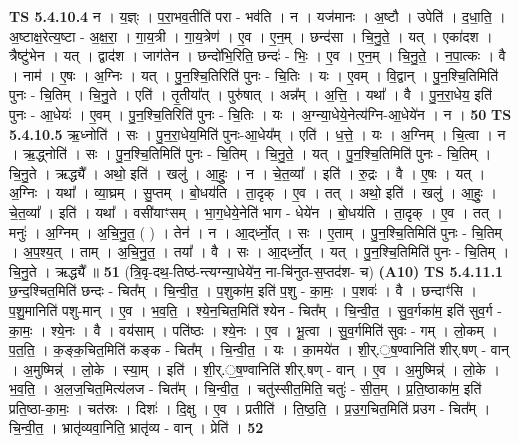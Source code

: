 \documentclass[17pt]{extarticle}
\begin{document}
                  \newline
                                \textbf{ TS 5.4.10.4} \newline
                  न । य॒ज्ञ्ः । प॒रा॒भव॒तीति॑ परा - भव॑ति । न । यज॑मानः । अ॒ष्टौ । उपेति॑ । द॒धा॒ति॒ । अ॒ष्टाक्ष॒रेत्य॒ष्टा - अ॒क्ष॒रा॒ । गा॒य॒त्री । गा॒य॒त्रेण॑ । ए॒व । ए॒न॒म् । छन्द॑सा । चि॒नु॒ते॒ । यत् । एका॑दश । त्रैष्टु॑भेन । यत् । द्वाद॑श । जाग॑तेन । छन्दो॑भि॒रिति॒ छन्दः॑ - भिः॒ । ए॒व । ए॒न॒म् । चि॒नु॒ते॒ । न॒पा॒त्कः । वै । नाम॑ । ए॒षः । अ॒ग्निः । यत् । पु॒न॒श्चि॒तिरिति॑ पुनः - चि॒तिः । यः । ए॒वम् । वि॒द्वान् । पु॒न॒श्चि॒तिमिति॑ पुनः - चि॒तिम् । चि॒नु॒ते । एति॑ । तृ॒तीया᳚त् । पुरु॑षात् । अन्न᳚म् । अ॒त्ति॒ । यथा᳚ । वै । पु॒न॒रा॒धेय॒ इति॑ पुनः - आ॒धेयः॑ । ए॒वम् । पु॒न॒श्चि॒तिरिति॑ पुनः - चि॒तिः । यः । अ॒ग्न्या॒धेये॒नेत्य॑ग्नि-आ॒धेये॑न । न । \textbf{  50} \newline
                  \newline
                                \textbf{ TS 5.4.10.5} \newline
                  ऋ॒ध्नोति॑ । सः । पु॒न॒रा॒धेय॒मिति॑ पुनः-आ॒धेय᳚म् । एति॑ । ध॒त्ते॒ । यः । अ॒ग्निम् । चि॒त्वा । न । ऋ॒द्ध्नोति॑ । सः । पु॒न॒श्चि॒तिमिति॑ पुनः - चि॒तिम् । चि॒नु॒ते॒ । यत् । पु॒न॒श्चि॒तिमिति॑ पुनः - चि॒तिम् । चि॒नु॒ते । ऋद्ध्यै᳚ । अथो॒ इति॑ । खलु॑ । आ॒हुः॒ । न । चे॒त॒व्या᳚ । इति॑ । रु॒द्रः । वै । ए॒षः । यत् । अ॒ग्निः । यथा᳚ । व्या॒घ्रम् । सु॒प्तम् । बो॒धय॑ति । ता॒दृक् । ए॒व । तत् । अथो॒ इति॑ । खलु॑ । आ॒हुः॒ । चे॒त॒व्या᳚ । इति॑ । यथा᳚ । वसी॑याꣳसम् । भा॒ग॒धेये॒नेति॑ भाग - धेये॑न । बो॒धय॑ति । ता॒दृक् । ए॒व । तत् । मनुः॑ । अ॒ग्निम् । अ॒चि॒नु॒त॒ ( ) । तेन॑ । न । आ॒द्‌र्ध्नो॒त् । सः । ए॒ताम् । पु॒न॒श्चि॒तिमिति॑ पुनः - चि॒तिम् । अ॒प॒श्य॒त् । ताम् । अ॒चि॒नु॒त॒ । तया᳚ । वै । सः । आ॒द्‌र्ध्नो॒त् । यत् । पु॒न॒श्चि॒तिमिति॑ पुनः - चि॒तिम् । चि॒नु॒ते । ऋद्ध्यै᳚ ॥ \textbf{  51} \newline
                  \newline
                      (त्रि॒वृ-दथ॒-तिष्ठ॑-न्त्यग्न्या॒धेये॑न॒ ना-चि॑नुत-स॒प्तद॑श- च)  \textbf{(A10)} \newline \newline
                                \textbf{ TS 5.4.11.1} \newline
                  छ॒न्द॒श्चित॒मिति॑ छन्दः - चित᳚म् । चि॒न्वी॒त॒ । प॒शुका॑म॒ इति॑ प॒शु - का॒मः॒ । प॒शवः॑ । वै । छन्दाꣳ॑सि । प॒शु॒मानिति॑ पशु-मान् । ए॒व । भ॒व॒ति॒ । श्ये॒न॒चित॒मिति॑ श्येन - चित᳚म् । चि॒न्वी॒त॒ । सु॒व॒र्गका॑म॒ इति॑ सुव॒र्ग - का॒मः॒ । श्ये॒नः । वै । वय॑साम् । पति॑ष्ठः । श्ये॒नः । ए॒व । भू॒त्वा । सु॒व॒र्गमिति॑ सुवः - गम् । लो॒कम् । प॒त॒ति॒ । क॒ङ्क॒चित॒मिति॑ कङ्क - चित᳚म् । चि॒न्वी॒त॒ । यः । का॒मये॑त । शी॒र्.॒ष॒ण्वानिति॑ शीर्.षण् - वान् । अ॒मुष्मिन्न्॑ । लो॒के । स्या॒म् । इति॑ । शी॒र्.॒ष॒ण्वानिति॑ शीर्.षण् - वान् । ए॒व । अ॒मुष्मिन्न्॑ । लो॒के । भ॒व॒ति॒ । अ॒ल॒ज॒चित॒मित्य॑लज - चित᳚म् । चि॒न्वी॒त॒ । चतु॑स्सीत॒मिति॒ चतुः॑ - सी॒त॒म् । प्र॒ति॒ष्ठाका॑म॒ इति॑ प्रति॒ष्ठा-का॒मः॒ । चत॑स्रः । दिशः॑ । दि॒क्षु । ए॒व । प्रतीति॑ । ति॒ष्ठ॒ति॒ । प्र॒उ॒ग॒चित॒मिति॑ प्र‌उग - चित᳚म् । चि॒न्वी॒त॒ । भ्रातृ॑व्यवा॒निति॒ भ्रातृ॑व्य - वान् । प्रेति॑ । \textbf{  52} \newline
\end{document}
